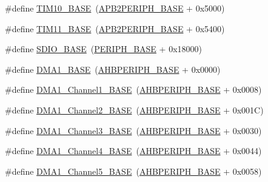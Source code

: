 \begin{DoxyCompactItemize}
\item 
\#define \hyperlink{group___peripheral__memory__map_ga3eff32f3801db31fb4b61d5618cad54a}{T\+I\+M10\+\_\+\+B\+A\+SE}~(\hyperlink{openmotestm_2library_2inc_2stm32f10x__map_8h_a25b99d6065f1c8f751e78f43ade652cb}{A\+P\+B2\+P\+E\+R\+I\+P\+H\+\_\+\+B\+A\+SE} + 0x5000)
\item 
\#define \hyperlink{group___peripheral__memory__map_ga3a4a06bb84c703084f0509e105ffaf1d}{T\+I\+M11\+\_\+\+B\+A\+SE}~(\hyperlink{openmotestm_2library_2inc_2stm32f10x__map_8h_a25b99d6065f1c8f751e78f43ade652cb}{A\+P\+B2\+P\+E\+R\+I\+P\+H\+\_\+\+B\+A\+SE} + 0x5400)
\item 
\#define \hyperlink{group___peripheral__memory__map_ga95dd0abbc6767893b4b02935fa846f52}{S\+D\+I\+O\+\_\+\+B\+A\+SE}~(\hyperlink{openmotestm_2library_2inc_2stm32f10x__map_8h_a9171f49478fa86d932f89e78e73b88b0}{P\+E\+R\+I\+P\+H\+\_\+\+B\+A\+SE} + 0x18000)
\item 
\#define \hyperlink{group___peripheral__memory__map_gab2d8a917a0e4ea99a22ac6ebf279bc72}{D\+M\+A1\+\_\+\+B\+A\+SE}~(\hyperlink{openmotestm_2library_2inc_2stm32f10x__map_8h_a92eb5d49730765d2abd0f5b09548f9f5}{A\+H\+B\+P\+E\+R\+I\+P\+H\+\_\+\+B\+A\+SE} + 0x0000)
\item 
\#define \hyperlink{group___peripheral__memory__map_ga888dbc1608243badeb3554ffedc7364c}{D\+M\+A1\+\_\+\+Channel1\+\_\+\+B\+A\+SE}~(\hyperlink{openmotestm_2library_2inc_2stm32f10x__map_8h_a92eb5d49730765d2abd0f5b09548f9f5}{A\+H\+B\+P\+E\+R\+I\+P\+H\+\_\+\+B\+A\+SE} + 0x0008)
\item 
\#define \hyperlink{group___peripheral__memory__map_ga38a70090eef3687e83fa6ac0c6d22267}{D\+M\+A1\+\_\+\+Channel2\+\_\+\+B\+A\+SE}~(\hyperlink{openmotestm_2library_2inc_2stm32f10x__map_8h_a92eb5d49730765d2abd0f5b09548f9f5}{A\+H\+B\+P\+E\+R\+I\+P\+H\+\_\+\+B\+A\+SE} + 0x001\+C)
\item 
\#define \hyperlink{group___peripheral__memory__map_ga70b3d9f36ca9ce95b4e421c11154fe5d}{D\+M\+A1\+\_\+\+Channel3\+\_\+\+B\+A\+SE}~(\hyperlink{openmotestm_2library_2inc_2stm32f10x__map_8h_a92eb5d49730765d2abd0f5b09548f9f5}{A\+H\+B\+P\+E\+R\+I\+P\+H\+\_\+\+B\+A\+SE} + 0x0030)
\item 
\#define \hyperlink{group___peripheral__memory__map_ga1adc93cd0baf0897202c71110e045692}{D\+M\+A1\+\_\+\+Channel4\+\_\+\+B\+A\+SE}~(\hyperlink{openmotestm_2library_2inc_2stm32f10x__map_8h_a92eb5d49730765d2abd0f5b09548f9f5}{A\+H\+B\+P\+E\+R\+I\+P\+H\+\_\+\+B\+A\+SE} + 0x0044)
\item 
\#define \hyperlink{group___peripheral__memory__map_gac041a71cd6c1973964f847a68aa14478}{D\+M\+A1\+\_\+\+Channel5\+\_\+\+B\+A\+SE}~(\hyperlink{openmotestm_2library_2inc_2stm32f10x__map_8h_a92eb5d49730765d2abd0f5b09548f9f5}{A\+H\+B\+P\+E\+R\+I\+P\+H\+\_\+\+B\+A\+SE} + 0x0058)

\end{DoxyCompactItemize}
